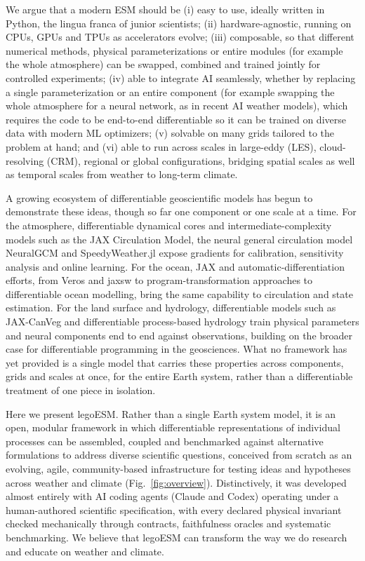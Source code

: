 \documentclass[11pt]{article}
\begin{document}
We argue that a modern ESM should be (i) easy to use, ideally written in Python, the lingua franca of
junior scientists; (ii) hardware-agnostic, running on CPUs, GPUs and TPUs as accelerators evolve;
(iii) composable, so that different numerical methods, physical parameterizations or entire modules
(for example the whole atmosphere) can be swapped, combined and trained jointly for controlled
experiments; (iv) able to integrate AI seamlessly, whether by replacing a single parameterization or
an entire component (for example swapping the whole atmosphere for a neural network, as in recent AI
weather models\cite{Pathak2022,Bi2023,Lam2023,Kochkov2024}), which requires the code to be end-to-end
differentiable so it can be trained on diverse data with modern ML optimizers; (v) solvable on many
grids tailored to the problem at hand; and (vi) able to run across scales in large-eddy (LES),
cloud-resolving (CRM), regional or global configurations, bridging spatial scales as well as temporal
scales from weather to long-term climate.

A growing ecosystem of differentiable geoscientific models has begun to demonstrate these ideas,
though so far one component or one scale at a time. For the atmosphere, differentiable dynamical
cores and intermediate-complexity models such as the JAX Circulation Model\cite{Davenport2026}, the
neural general circulation model NeuralGCM\cite{Kochkov2024} and SpeedyWeather.jl\cite{Klower2024}
expose gradients for calibration, sensitivity analysis and online learning. For the ocean, JAX and
automatic-differentiation efforts, from Veros\cite{Hafner2018} and jaxsw\cite{Johnson2023jaxsw} to
program-transformation approaches to differentiable ocean modelling\cite{Moses2026DJ4Earth}, bring the
same capability to circulation and state estimation. For the land surface and hydrology,
differentiable models such as JAX-CanVeg\cite{Jiang2025CanVeg} and differentiable process-based
hydrology\cite{Shen2023} train physical parameters and neural components end to end against
observations, building on the broader case for differentiable programming in the
geosciences\cite{Gelbrecht2023,Kochkov2021}. What no framework has yet provided is a single model that
carries these properties across components, grids and scales at once, for the entire Earth system,
rather than a differentiable treatment of one piece in isolation.

Here we present legoESM. Rather than a single Earth system model, it is an open, modular framework in
which differentiable representations of individual processes can be assembled, coupled and
benchmarked against alternative formulations to address diverse scientific questions, conceived from
scratch as an evolving, agile, community-based infrastructure for testing ideas and hypotheses across
weather and climate (Fig.~\ref{fig:overview}). Distinctively, it was developed almost entirely with AI
coding agents (Claude and Codex) operating under a human-authored scientific specification, with every
declared physical invariant checked mechanically through contracts, faithfulness oracles and
systematic benchmarking. We believe that legoESM can transform the way we do research and educate on
weather and climate.
\end{document}
